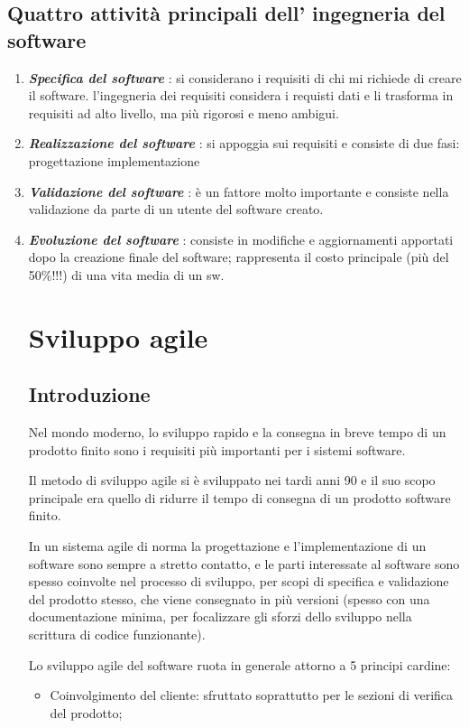 \documentclass[a4paper, 10pt]{article}
\begin{document}
	\subsection*{Quattro attività principali dell' ingegneria del software}
	\begin{enumerate}
		\item \textbf{\textit{Specifica del software}} : si considerano i requisiti di chi mi richiede di
		creare il software.
		\subitem{-} l'ingegneria dei requisiti considera i requisti dati e li trasforma in
		requisiti ad alto livello, ma più rigorosi e meno ambigui.
		\item \textbf{\textit{Realizzazione del software}} : si appoggia sui requisiti e consiste di due fasi:
		\subitem{-} progettazione
		\subitem{-} implementazione
		\item \textbf{\textit{Validazione del software}} : è un fattore molto importante e consiste nella
		validazione da parte di un utente del software creato.
		\item \textbf{\textit{Evoluzione del software}} : consiste in modifiche e aggiornamenti apportati
		dopo la creazione finale del software; rappresenta il costo principale
		(più del 50\%!!!) di una vita media di un sw.
		
		\section{Sviluppo agile}
		\subsection{Introduzione}
		Nel mondo moderno, lo sviluppo rapido e la consegna in breve tempo di un prodotto finito sono i requisiti più importanti per i sistemi software.
		
		Il metodo di sviluppo agile si è sviluppato nei tardi anni 90 e il suo scopo principale era quello di ridurre il tempo di consegna di un prodotto software finito. 
		
		In un sistema agile di norma la progettazione e l'implementazione di un software sono sempre a stretto contatto, e le parti interessate al software sono spesso coinvolte nel processo di sviluppo, per scopi di specifica e validazione del prodotto stesso, che viene consegnato in più versioni (spesso con una documentazione minima, per focalizzare gli sforzi dello sviluppo nella scrittura di codice funzionante).
		
		Lo sviluppo agile del software ruota in generale attorno a 5 principi cardine:
		\begin{itemize}
			\item Coinvolgimento del cliente: sfruttato soprattutto per le sezioni di verifica del prodotto;
			

\end{itemize}
\end{enumerate}
\end{document}
